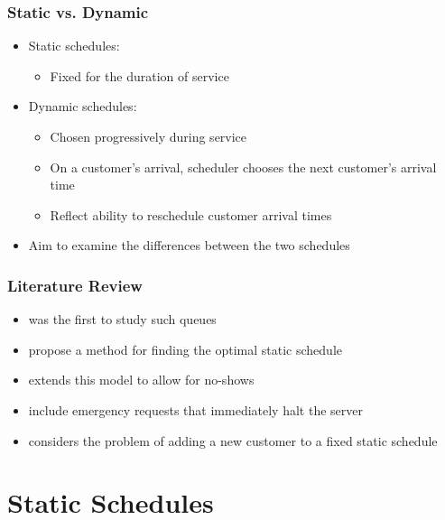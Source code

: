 \documentclass{beamer}
\begin{document}
\begin{frame}
	\frametitle{Static vs. Dynamic}

	\begin{itemize}
		\item Static schedules:
		\begin{itemize}
			\item Fixed for the duration of service
		\end{itemize}
		\item Dynamic schedules:
		\begin{itemize}
		 	\item Chosen progressively during service
		 	\item On a customer's arrival, scheduler chooses the next customer's arrival time
		 	\item Reflect ability to reschedule customer arrival times
		 \end{itemize}
		\item Aim to examine the differences between the two schedules
	\end{itemize}
\end{frame}

\begin{frame}
	\frametitle{Literature Review}

	\begin{itemize}
		\item \citet{Bailey} was the first to study such queues
		\item \citet{Pegden} propose a method for finding the optimal static schedule
		\item \citet{Mendel} extends this model to allow for no-shows
		\item \citet{Fiems} include emergency requests that immediately halt the server
		\item \citet{Wang} considers the problem of adding a new customer to a fixed static schedule
	\end{itemize}
\end{frame}

\section{Static Schedules}
\end{document}
